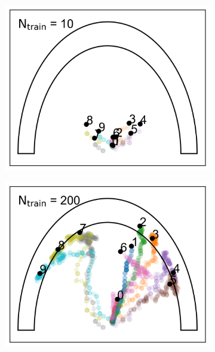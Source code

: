 \documentclass[aps,prb,twocolumn,superscriptaddress,floatfix,longbibliography]{revtex4-2}
\begin{document}
\onecolumngrid


\begin{figure}
  \centering
  \begin{subfigure}[b]{0.24\textwidth}
      \centering
      \includegraphics[width=\textwidth]{ej2_fig1_1.png}
      \caption{\label{fig:ej2_fig1_1}}
  \end{subfigure}
  \hfill
  \begin{subfigure}[b]{0.24\textwidth}
      \centering
      \includegraphics[width=\textwidth]{ej2_fig1_2.png}
      \caption{\label{fig:ej2_fig1_2}}
  \end{subfigure}

\end{figure}
\end{document}
